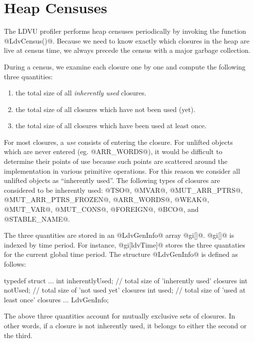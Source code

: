 \documentclass{article}
\begin{document}
\section{Heap Censuses}
\label{sec-heap-censuses}

The LDVU profiler performs heap censuses periodically by invoking the
function @LdvCensus()@.  Because we need to know exactly which
closures in the heap are live at census time, we always precede the
census with a major garbage collection.

During a census, we examine each closure one by one and compute the
following three quantities:

\begin{enumerate}
\item the total size of all \emph{inherently used} closures.
\item the total size of all closures which have not been used (yet).
\item the total size of all closures which have been used at least once. 
\end{enumerate}

For most closures, a \emph{use} consists of entering the closure.  For
unlifted objects which are never entered (eg. @ARR_WORDS@), it would
be difficult to determine their points of use because such points are
scattered around the implementation in various primitive operations.
For this reason we consider all unlifted objects as ``inherently
used''.  The following types of closures are considered to be
inherently used: @TSO@, @MVAR@, @MUT_ARR_PTRS@, @MUT_ARR_PTRS_FROZEN@,
@ARR_WORDS@, @WEAK@, @MUT_VAR@, @MUT_CONS@, @FOREIGN@, @BCO@, and
@STABLE_NAME@.

The three quantities are stored in an @LdvGenInfo@ array @gi[]@.
@gi[]@ is indexed by time period.  For instance, @gi[ldvTime]@ stores
the three quantaties for the current global time period.  The
structure @LdvGenInfo@ is defined as follows:

\begin{code}
typedef struct {
  ...
  int inherentlyUsed;   // total size of 'inherently used' closures
  int notUsed;          // total size of 'not used yet' closures
  int used;             // total size of 'used at least once' closures
  ...
} LdvGenInfo;
\end{code} 

The above three quantities account for mutually exclusive sets of closures.
In other words, if a closure is not inherently used, it belongs to 
either the second or the third.
\end{document}
